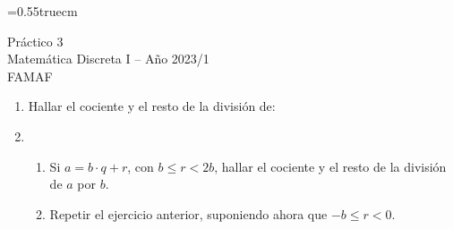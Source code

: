 \documentclass[a4paper,12pt,twoside,spanish,reqno]{amsbook}
\numberwithin{equation}{section}
\begin{document}
    \baselineskip=0.55truecm %

{\bf \begin{center}\large  Práctico 3 \\ Matemática Discreta I -- Año 2023/1 \\ FAMAF \end{center}}



\begin{enumerate}
\setlength\itemsep{1.1em}


\item Hallar el cociente y el resto de la división de:

\item 
    \begin{enumerate}
        \item Si $a=b\cdot q+r$, con $b \le r <2 b$, hallar el cociente y el resto de la división de $a$ por $b$.
        \item Repetir el ejercicio anterior, suponiendo ahora que $-b \le r < 0$.
    \end{enumerate}



\end{enumerate}
\end{document}
